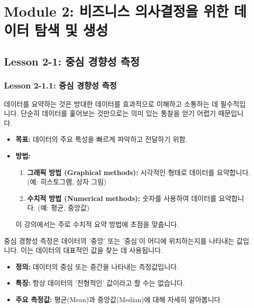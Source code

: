 \documentclass[11pt,a4paper]{article}
\begin{document}
\newpage
\section*{Module 2: 비즈니스 의사결정을 위한 데이터 탐색 및 생성}

\subsection*{Lesson 2-1: 중심 경향성 측정}

\subsubsection*{Lesson 2-1.1: 중심 경향성 측정}

\begin{tcolorbox}[mybox={데이터 요약의 필요성}]
데이터를 요약하는 것은 방대한 데이터를 효과적으로 이해하고 소통하는 데 필수적입니다.
단순히 데이터를 훑어보는 것만으로는 의미 있는 통찰을 얻기 어렵기 때문입니다.

\begin{itemize}
    \item \textbf{목표:} 데이터의 주요 특성을 빠르게 파악하고 전달하기 위함.
    \item \textbf{방법:}
    \begin{enumerate}
        \item \textbf{그래픽 방법 (Graphical methods):} 시각적인 형태로 데이터를 요약합니다. (예: 히스토그램, 상자 그림)
        \item \textbf{수치적 방법 (Numerical methods):} 숫자를 사용하여 데이터를 요약합니다. (예: 평균, 중앙값)
    \end{enumerate}
    이 강의에서는 주로 수치적 요약 방법에 초점을 맞춥니다.
\end{itemize}
\end{tcolorbox}

\begin{tcolorbox}[mybox={중심 경향성 (Central Tendency)}]
중심 경향성 측정은 데이터의 '중앙' 또는 '중심'이 어디에 위치하는지를 나타내는 값입니다.
이는 데이터의 대표적인 값을 찾는 데 사용됩니다.

\begin{itemize}
    \item \textbf{정의:} 데이터의 중심 또는 중간을 나타내는 측정값입니다.
    \item \textbf{특징:} 항상 데이터의 '전형적인' 값이라고 할 수는 없습니다.
    \item \textbf{주요 측정값:} 평균(Mean)과 중앙값(Median)에 대해 자세히 알아봅니다.
\end{itemize}
\end{tcolorbox}
\end{document}
